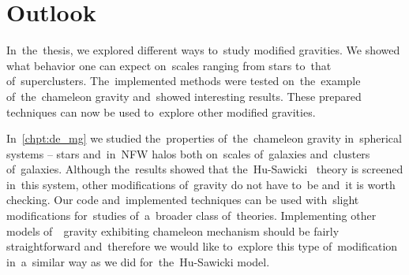 \chapter{Outlook}
\label{chpt:outlook}
In~the~thesis, we explored different ways to~study modified gravities. We showed what behavior one can expect on~scales ranging from stars to~that of~superclusters. The~implemented methods were tested on~the~example of~the~chameleon gravity and~showed interesting results. These prepared techniques can now be used to~explore other modified gravities.

In~\autoref{chpt:de_mg} we studied the~properties of~the~chameleon gravity in~spherical systems -- stars and~in~NFW halos both on~scales of~galaxies and~clusters of~galaxies. Although the~results showed that the~Hu-Sawicki \fR\ theory is screened in~this system, other modifications of~gravity do not have to~be and~it is worth checking. Our code and~implemented techniques can be used with~slight modifications for~studies of~a~broader class of~theories. Implementing other models of~\fR\ gravity exhibiting chameleon mechanism should be fairly straightforward and~therefore we would like to~explore this type of~modification in~a~similar way as we did for~the~Hu-Sawicki model.


